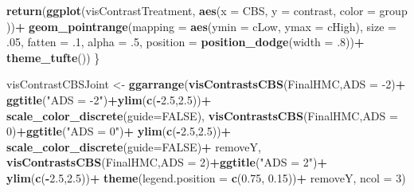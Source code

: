 \documentclass[10pt,dvipsnames,enabledeprecatedfontcommands]{scrartcl}
\newenvironment{Shaded}{\begin{snugshade}}{\end{snugshade}}
\newcommand{\KeywordTok}[1]{\textcolor[rgb]{0.13,0.29,0.53}{\textbf{#1}}}
\newcommand{\DataTypeTok}[1]{\textcolor[rgb]{0.13,0.29,0.53}{#1}}
\newcommand{\DecValTok}[1]{\textcolor[rgb]{0.00,0.00,0.81}{#1}}
\newcommand{\FloatTok}[1]{\textcolor[rgb]{0.00,0.00,0.81}{#1}}
\newcommand{\StringTok}[1]{\textcolor[rgb]{0.31,0.60,0.02}{#1}}
\newcommand{\OtherTok}[1]{\textcolor[rgb]{0.56,0.35,0.01}{#1}}
\newcommand{\OperatorTok}[1]{\textcolor[rgb]{0.81,0.36,0.00}{\textbf{#1}}}
\newcommand{\NormalTok}[1]{#1}
\begin{document}
\begin{Shaded}
\begin{Highlighting}[]
  \KeywordTok{return}\NormalTok{(}\KeywordTok{ggplot}\NormalTok{(visContrastTreatment, }\KeywordTok{aes}\NormalTok{(}\DataTypeTok{x =}\NormalTok{ CBS, }\DataTypeTok{y =}\NormalTok{ contrast, }\DataTypeTok{color =}\NormalTok{ group ))}\OperatorTok{+}
\StringTok{            }\KeywordTok{geom_pointrange}\NormalTok{(}\DataTypeTok{mapping =} 
        \KeywordTok{aes}\NormalTok{(}\DataTypeTok{ymin =}\NormalTok{ cLow, }\DataTypeTok{ymax =}\NormalTok{ cHigh), }\DataTypeTok{size =} \FloatTok{.05}\NormalTok{, }
        \DataTypeTok{fatten =} \FloatTok{.1}\NormalTok{, }\DataTypeTok{alpha =} \FloatTok{.5}\NormalTok{,}
        \DataTypeTok{position =} \KeywordTok{position_dodge}\NormalTok{(}\DataTypeTok{width =} \FloatTok{.8}\NormalTok{))}\OperatorTok{+}
\StringTok{          }\KeywordTok{theme_tufte}\NormalTok{())}
\NormalTok{\}}


\NormalTok{visContrastCBSJoint <-}\StringTok{ }\KeywordTok{ggarrange}\NormalTok{(}\KeywordTok{visContrastsCBS}\NormalTok{(FinalHMC,}\DataTypeTok{ADS =} \DecValTok{-2}\NormalTok{)}\OperatorTok{+}
\StringTok{      }\KeywordTok{ggtitle}\NormalTok{(}\StringTok{"ADS = -2"}\NormalTok{)}\OperatorTok{+}\KeywordTok{ylim}\NormalTok{(}\KeywordTok{c}\NormalTok{(}\OperatorTok{-}\FloatTok{2.5}\NormalTok{,}\FloatTok{2.5}\NormalTok{))}\OperatorTok{+}\StringTok{ }\KeywordTok{scale_color_discrete}\NormalTok{(}\DataTypeTok{guide=}\OtherTok{FALSE}\NormalTok{),}
          \KeywordTok{visContrastsCBS}\NormalTok{(FinalHMC,}\DataTypeTok{ADS =} \DecValTok{0}\NormalTok{)}\OperatorTok{+}\KeywordTok{ggtitle}\NormalTok{(}\StringTok{"ADS = 0"}\NormalTok{)}\OperatorTok{+}
\StringTok{        }\KeywordTok{ylim}\NormalTok{(}\KeywordTok{c}\NormalTok{(}\OperatorTok{-}\FloatTok{2.5}\NormalTok{,}\FloatTok{2.5}\NormalTok{))}\OperatorTok{+}\StringTok{ }\KeywordTok{scale_color_discrete}\NormalTok{(}\DataTypeTok{guide=}\OtherTok{FALSE}\NormalTok{)}\OperatorTok{+}
\StringTok{        }\NormalTok{removeY,}
        \KeywordTok{visContrastsCBS}\NormalTok{(FinalHMC,}\DataTypeTok{ADS =} \DecValTok{2}\NormalTok{)}\OperatorTok{+}\KeywordTok{ggtitle}\NormalTok{(}\StringTok{"ADS = 2"}\NormalTok{)}\OperatorTok{+}
\StringTok{        }\KeywordTok{ylim}\NormalTok{(}\KeywordTok{c}\NormalTok{(}\OperatorTok{-}\FloatTok{2.5}\NormalTok{,}\FloatTok{2.5}\NormalTok{))}\OperatorTok{+}\StringTok{ }\KeywordTok{theme}\NormalTok{(}\DataTypeTok{legend.position =} \KeywordTok{c}\NormalTok{(}\FloatTok{0.75}\NormalTok{, }\FloatTok{0.15}\NormalTok{))}\OperatorTok{+}
\StringTok{        }\NormalTok{removeY, }\DataTypeTok{ncol =} \DecValTok{3}\NormalTok{)}


\end{Highlighting}
\end{Shaded}
\end{document}
